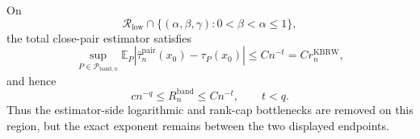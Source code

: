On
\[
\mathcal R_{\mathrm{low}}\cap
\{(\alpha,\beta,\gamma):0<\beta<\alpha\leq1\},
\]
the total close-pair estimator satisfies
\[
\sup_{P\in\mathcal P_{\mathrm{band},n}}
\mathbb E_P\left|
\widehat\tau_n^{\mathrm{pair}}(x_0)-\tau_P(x_0)
\right|\leq Cn^{-t}=Cr_n^{\mathrm{KBRW}},
\]
and hence
\[
cn^{-q}\leq R_n^{\mathrm{band}}\leq Cn^{-t},
\qquad t<q.
\]
Thus the estimator-side logarithmic and rank-cap bottlenecks are removed on this region, but the exact exponent remains between the two displayed endpoints.